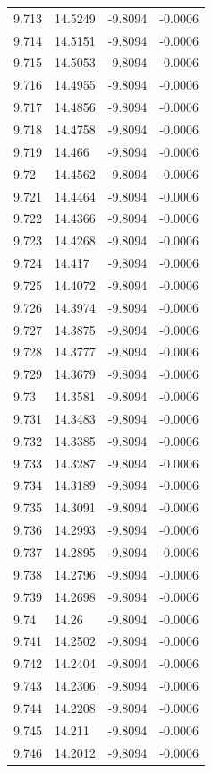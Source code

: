 \begin{tabular}{llll}
9.713 & 14.5249 & -9.8094 & -0.0006 \\
9.714 & 14.5151 & -9.8094 & -0.0006 \\
9.715 & 14.5053 & -9.8094 & -0.0006 \\
9.716 & 14.4955 & -9.8094 & -0.0006 \\
9.717 & 14.4856 & -9.8094 & -0.0006 \\
9.718 & 14.4758 & -9.8094 & -0.0006 \\
9.719 & 14.466 & -9.8094 & -0.0006 \\
9.72 & 14.4562 & -9.8094 & -0.0006 \\
9.721 & 14.4464 & -9.8094 & -0.0006 \\
9.722 & 14.4366 & -9.8094 & -0.0006 \\
9.723 & 14.4268 & -9.8094 & -0.0006 \\
9.724 & 14.417 & -9.8094 & -0.0006 \\
9.725 & 14.4072 & -9.8094 & -0.0006 \\
9.726 & 14.3974 & -9.8094 & -0.0006 \\
9.727 & 14.3875 & -9.8094 & -0.0006 \\
9.728 & 14.3777 & -9.8094 & -0.0006 \\
9.729 & 14.3679 & -9.8094 & -0.0006 \\
9.73 & 14.3581 & -9.8094 & -0.0006 \\
9.731 & 14.3483 & -9.8094 & -0.0006 \\
9.732 & 14.3385 & -9.8094 & -0.0006 \\
9.733 & 14.3287 & -9.8094 & -0.0006 \\
9.734 & 14.3189 & -9.8094 & -0.0006 \\
9.735 & 14.3091 & -9.8094 & -0.0006 \\
9.736 & 14.2993 & -9.8094 & -0.0006 \\
9.737 & 14.2895 & -9.8094 & -0.0006 \\
9.738 & 14.2796 & -9.8094 & -0.0006 \\
9.739 & 14.2698 & -9.8094 & -0.0006 \\
9.74 & 14.26 & -9.8094 & -0.0006 \\
9.741 & 14.2502 & -9.8094 & -0.0006 \\
9.742 & 14.2404 & -9.8094 & -0.0006 \\
9.743 & 14.2306 & -9.8094 & -0.0006 \\
9.744 & 14.2208 & -9.8094 & -0.0006 \\
9.745 & 14.211 & -9.8094 & -0.0006 \\
9.746 & 14.2012 & -9.8094 & -0.0006 \\

\end{tabular}
